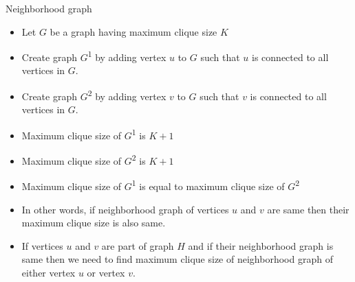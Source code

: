 \documentclass[landscape]{slides}
\begin{document}
\begin{slide}

\begin{center}
	\begin{center}
		{\large Neighborhood graph }
	\end{center}

\end{center}

	\begin{itemize}
		\setlength{\itemsep}{0pt}
		\setlength{\parskip}{0pt}
		\setlength{\parsep}{0pt}
		\item Let {$G$} be a graph having maximum clique size {$K$}
		\item Create graph {$G$}\textsuperscript{1} by adding vertex {$u$} to {$G$} such that {$u$} is connected to all vertices in {$G$}.
		\item Create graph {$G$}\textsuperscript{2} by adding vertex {$v$} to {$G$} such that {$v$} is connected to all vertices in {$G$}.
		\item Maximum clique size of {$G$}\textsuperscript{1} is {$K + 1$}
		\item Maximum clique size of {$G$}\textsuperscript{2} is {$K + 1$}
		\item Maximum clique size of {$G$}\textsuperscript{1} is equal to maximum clique size of {$G$}\textsuperscript{2}
		\item In other words, if neighborhood graph of vertices {$u$} and {$v$} are same then their maximum clique size is also same.
		\item If vertices {$u$} and {$v$} are part of graph {$H$} and if their neighborhood graph is same then we need to find maximum clique size of neighborhood graph of either vertex {$u$} or vertex {$v$}. 
	\end{itemize}
\end{slide}
\end{document}
